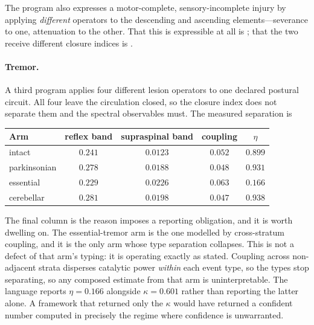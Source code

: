 \documentclass[11pt,twocolumn,a4paper]{article}
\theoremstyle{thmstyle}
\theoremstyle{definition}
\theoremstyle{remark}
\newcommand{\kap}{\kappa}
\begin{document}
The program also expresses a motor-complete, sensory-incomplete injury by
applying \emph{different} operators to the descending and ascending
elements---severance to one, attenuation to the other. That this is
expressible at all is ; that the two receive different
closure indices is .

\paragraph{Tremor.}
A third program applies four different lesion operators to one declared
postural circuit. All four leave the circulation closed, so the closure
index does not separate them and the spectral observables must. The measured
separation is

\begin{center}
\begin{tabular}{@{}lcccc@{}}
\toprule
Arm & reflex band & supraspinal band & coupling & $\eta$\\
\midrule
intact       & $0.241$ & $0.0123$ & $0.052$ & $0.899$\\
parkinsonian & $0.278$ & $0.0188$ & $0.048$ & $0.931$\\
essential    & $0.229$ & $0.0226$ & $0.063$ & $\mathbf{0.166}$\\
cerebellar   & $0.281$ & $0.0198$ & $0.047$ & $0.938$\\
\bottomrule
\end{tabular}
\end{center}

The final column is the reason  imposes a reporting
obligation, and it is worth dwelling on. The essential-tremor arm is the one
modelled by cross-stratum coupling, and it is the only arm whose type
separation collapses. This is not a defect of that arm's typing: it is
 operating exactly as stated. Coupling across
non-adjacent strata disperses catalytic power \emph{within} each event type,
so the types stop separating, so any composed estimate from that arm is
uninterpretable. The language reports $\eta=0.166$ alongside $\kap=0.601$
rather than reporting the latter alone. A framework that returned only the
$\kap$ would have returned a confident number computed in precisely the
regime where confidence is unwarranted.
\end{document}

